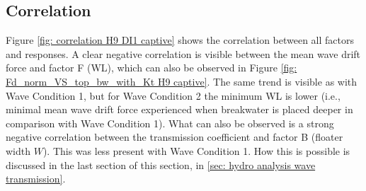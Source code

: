 \subsection{Correlation}
\label{sec: H9 captive correlation}

Figure \ref{fig: correlation H9 DI1 captive} shows the correlation between all factors and responses. A clear negative correlation is visible between the mean wave drift force and factor F (WL), which can also be observed in Figure \ref{fig: Fd_norm_VS_top_bw_with_Kt H9 captive}. The same trend is visible as with Wave Condition 1, but for Wave Condition 2 the minimum WL is lower (i.e., minimal mean wave drift force experienced when breakwater is placed deeper in comparison with Wave Condition 1).  What can also be observed is a strong negative correlation between the transmission coefficient and factor B (floater width $W$). This was less present with Wave Condition 1. How this is possible is discussed in the last section of this section, in \ref{sec: hydro analysis wave transmission}.


